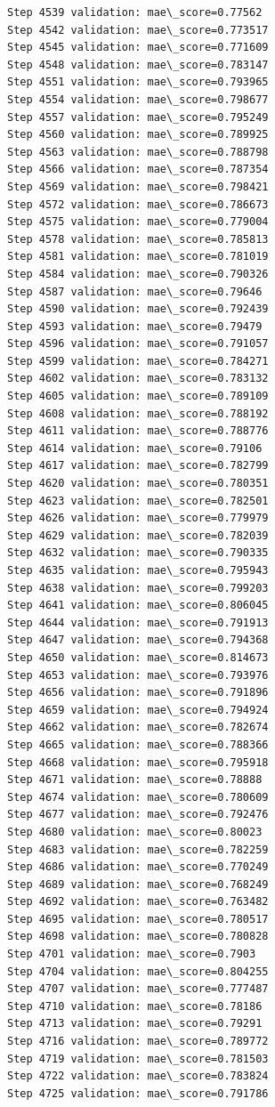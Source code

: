 \documentclass[11pt]{article}
\begin{document}
\begin{Verbatim}[commandchars=\\\{\}]
Step 4539 validation: mae\_score=0.77562
Step 4542 validation: mae\_score=0.773517
Step 4545 validation: mae\_score=0.771609
Step 4548 validation: mae\_score=0.783147
Step 4551 validation: mae\_score=0.793965
Step 4554 validation: mae\_score=0.798677
Step 4557 validation: mae\_score=0.795249
Step 4560 validation: mae\_score=0.789925
Step 4563 validation: mae\_score=0.788798
Step 4566 validation: mae\_score=0.787354
Step 4569 validation: mae\_score=0.798421
Step 4572 validation: mae\_score=0.786673
Step 4575 validation: mae\_score=0.779004
Step 4578 validation: mae\_score=0.785813
Step 4581 validation: mae\_score=0.781019
Step 4584 validation: mae\_score=0.790326
Step 4587 validation: mae\_score=0.79646
Step 4590 validation: mae\_score=0.792439
Step 4593 validation: mae\_score=0.79479
Step 4596 validation: mae\_score=0.791057
Step 4599 validation: mae\_score=0.784271
Step 4602 validation: mae\_score=0.783132
Step 4605 validation: mae\_score=0.789109
Step 4608 validation: mae\_score=0.788192
Step 4611 validation: mae\_score=0.788776
Step 4614 validation: mae\_score=0.79106
Step 4617 validation: mae\_score=0.782799
Step 4620 validation: mae\_score=0.780351
Step 4623 validation: mae\_score=0.782501
Step 4626 validation: mae\_score=0.779979
Step 4629 validation: mae\_score=0.782039
Step 4632 validation: mae\_score=0.790335
Step 4635 validation: mae\_score=0.795943
Step 4638 validation: mae\_score=0.799203
Step 4641 validation: mae\_score=0.806045
Step 4644 validation: mae\_score=0.791913
Step 4647 validation: mae\_score=0.794368
Step 4650 validation: mae\_score=0.814673
Step 4653 validation: mae\_score=0.793976
Step 4656 validation: mae\_score=0.791896
Step 4659 validation: mae\_score=0.794924
Step 4662 validation: mae\_score=0.782674
Step 4665 validation: mae\_score=0.788366
Step 4668 validation: mae\_score=0.795918
Step 4671 validation: mae\_score=0.78888
Step 4674 validation: mae\_score=0.780609
Step 4677 validation: mae\_score=0.792476
Step 4680 validation: mae\_score=0.80023
Step 4683 validation: mae\_score=0.782259
Step 4686 validation: mae\_score=0.770249
Step 4689 validation: mae\_score=0.768249
Step 4692 validation: mae\_score=0.763482
Step 4695 validation: mae\_score=0.780517
Step 4698 validation: mae\_score=0.780828
Step 4701 validation: mae\_score=0.7903
Step 4704 validation: mae\_score=0.804255
Step 4707 validation: mae\_score=0.777487
Step 4710 validation: mae\_score=0.78186
Step 4713 validation: mae\_score=0.79291
Step 4716 validation: mae\_score=0.789772
Step 4719 validation: mae\_score=0.781503
Step 4722 validation: mae\_score=0.783824
Step 4725 validation: mae\_score=0.791786

\end{Verbatim}
\end{document}
